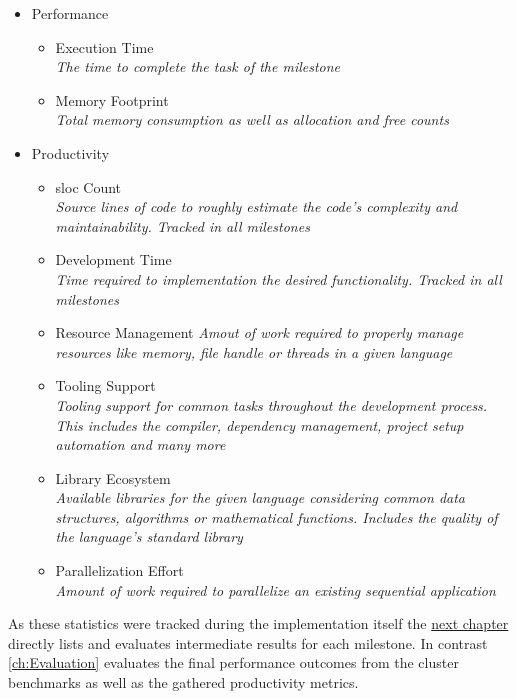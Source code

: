 \begin{itemize}
    \item Performance
    \begin{itemize}
        \item Execution Time\\
        \textit{The time to complete the task of the milestone}
        \item Memory Footprint\\
        \textit{Total memory consumption as well as allocation and free counts}
    \end{itemize}
    \item Productivity
    \begin{itemize}
        \item \acrshort{sloc} Count\\
        \textit{Source lines of code to roughly estimate the code's complexity and maintainability. Tracked in all milestones}
        \item Development Time\\
        \textit{Time required to implementation the desired functionality. Tracked in all milestones}
        \item Resource Management
        \textit{Amout of work required to properly manage resources like memory, file handle or threads in a given language}
        \item Tooling Support\\
        \textit{Tooling support for common tasks throughout the development process. This includes the compiler, dependency management, project setup automation and many more}
        \item Library Ecosystem\\
        \textit{Available libraries for the given language considering common data structures, algorithms or mathematical functions. Includes the quality of the language's standard library}
        \item Parallelization Effort\\
        \textit{Amount of work required to parallelize an existing sequential application}
    \end{itemize}
\end{itemize}

As these statistics were tracked during the implementation itself the \hyperref[ch:Implementation]{next chapter} directly lists and evaluates intermediate results for each milestone. In contrast \autoref{ch:Evaluation} evaluates the final performance outcomes from the cluster benchmarks as well as the gathered productivity metrics.

